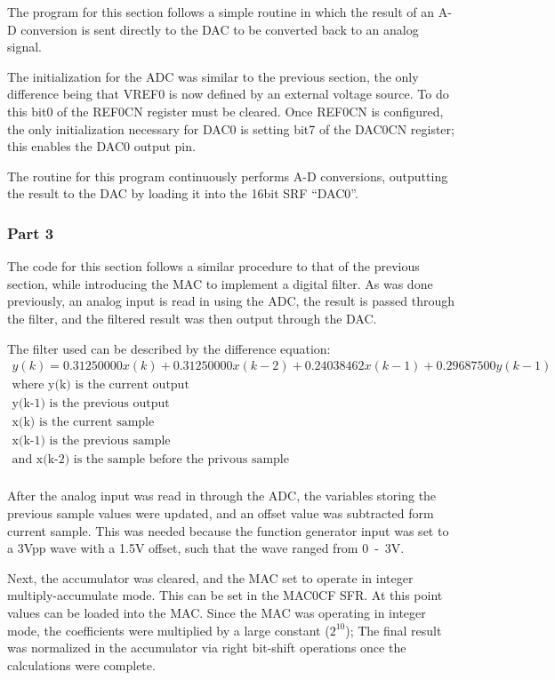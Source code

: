 \documentclass[12pt]{article}
\begin{document}
The program for this section follows a simple routine in which the result of an A-D conversion is sent directly to the DAC to be converted back to an analog signal. 

The initialization for the ADC was similar to the previous section, the only difference being that VREF0 is now defined by an external voltage source. To do this bit0 of the REF0CN register must be cleared. Once REF0CN is configured, the only initialization necessary for DAC0 is setting bit7 of the DAC0CN register; this enables the DAC0 output pin.

The routine for this program continuously performs A-D conversions, outputting the result to the DAC by loading it into the 16bit SRF ``DAC0''.

\subsubsection{Part 3}

The code for this section follows a similar procedure to that of the previous section, while introducing the MAC to implement a digital filter. As was done previously, an analog input is read in using the ADC, the result is passed through the filter, and the filtered result was then output through the DAC.

The filter used can be described by the difference equation:
\begin{gather*}
y(k) = 0.31250000x(k) + 0.31250000x(k-2) + 0.24038462x(k-1) + 0.29687500y(k-1)\\
\text{where y(k) is the current output}\\
\text{y(k-1) is the previous output}\\
\text{x(k) is the current sample}\\
\text{x(k-1) is the previous sample}\\
\text{and x(k-2) is the sample before the privous sample}\\
\end{gather*}

After the analog input was read in through the ADC, the variables storing the previous sample values were updated, and an offset value was subtracted form current sample. This was needed because the function generator input was set to a \si{3}{Vpp} wave with a \si{\num{1.5}}{V} offset, such that the wave ranged from \si{0-3}{V}.

Next, the accumulator was cleared, and the MAC set to operate in integer multiply-accumulate mode. This can be set in the MAC0CF SFR. At this point values can be loaded into the MAC. Since the MAC was operating in integer mode, the coefficients were multiplied by a large constant ($2^{10}$); The final result was normalized in the accumulator via right bit-shift operations once the calculations were complete.    
\end{document}

